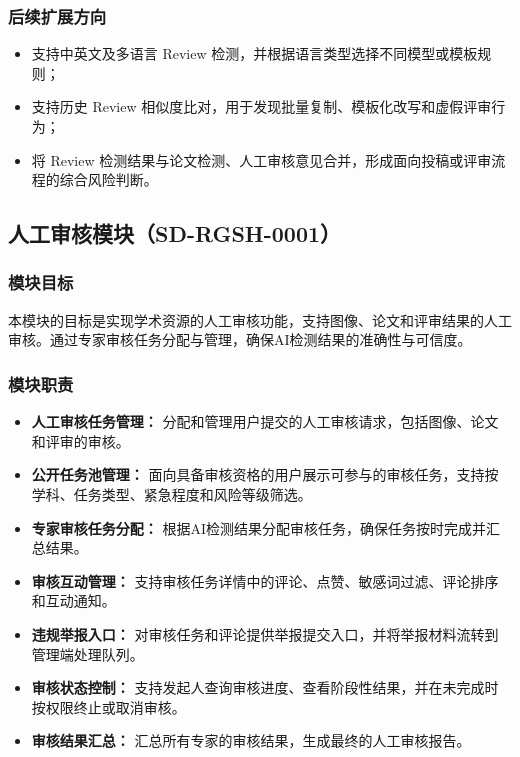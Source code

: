 \subsubsection{后续扩展方向}
\begin{itemize}[leftmargin=2em]
    \item 支持中英文及多语言 Review 检测，并根据语言类型选择不同模型或模板规则；
    \item 支持历史 Review 相似度比对，用于发现批量复制、模板化改写和虚假评审行为；
    \item 将 Review 检测结果与论文检测、人工审核意见合并，形成面向投稿或评审流程的综合风险判断。
\end{itemize}

\subsection{人工审核模块（SD-RGSH-0001）}

\subsubsection{模块目标}
本模块的目标是实现学术资源的人工审核功能，支持图像、论文和评审结果的人工审核。通过专家审核任务分配与管理，确保AI检测结果的准确性与可信度。

\subsubsection{模块职责}
\begin{itemize}[leftmargin=2em]
    \item \textbf{人工审核任务管理：} 分配和管理用户提交的人工审核请求，包括图像、论文和评审的审核。
    \item \textbf{公开任务池管理：} 面向具备审核资格的用户展示可参与的审核任务，支持按学科、任务类型、紧急程度和风险等级筛选。
    \item \textbf{专家审核任务分配：} 根据AI检测结果分配审核任务，确保任务按时完成并汇总结果。
    \item \textbf{审核互动管理：} 支持审核任务详情中的评论、点赞、敏感词过滤、评论排序和互动通知。
    \item \textbf{违规举报入口：} 对审核任务和评论提供举报提交入口，并将举报材料流转到管理端处理队列。
    \item \textbf{审核状态控制：} 支持发起人查询审核进度、查看阶段性结果，并在未完成时按权限终止或取消审核。
    \item \textbf{审核结果汇总：} 汇总所有专家的审核结果，生成最终的人工审核报告。
\end{itemize}

